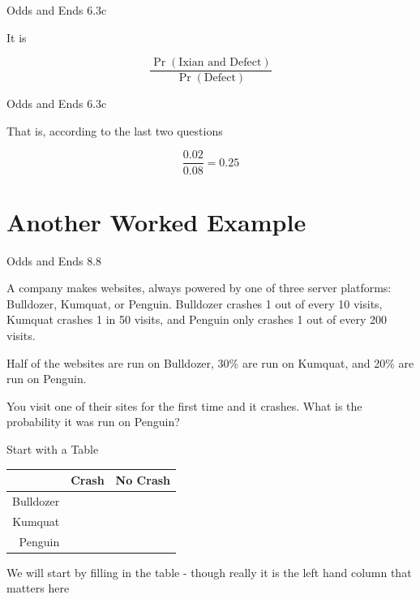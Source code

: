 \documentclass[
  ignorenonframetext,
]{beamer}
\renewcommand{\,}{\text{, }}
\begin{document}
\begin{frame}{Odds and Ends 6.3c}
\protect\hypertarget{odds-and-ends-6.3c-2}{}

It is

\[
\frac{\Pr(\text{Ixian and Defect})}{\Pr(\text{Defect})}
\]

\end{frame}

\begin{frame}{Odds and Ends 6.3c}
\protect\hypertarget{odds-and-ends-6.3c-3}{}

That is, according to the last two questions

\[
\frac{0.02}{0.08} = 0.25
\]

\end{frame}

\hypertarget{another-worked-example}{%
\section{Another Worked Example}\label{another-worked-example}}

\begin{frame}{Odds and Ends 8.8}
\protect\hypertarget{odds-and-ends-8.8}{}

A company makes websites, always powered by one of three server
platforms: Bulldozer, Kumquat, or Penguin. Bulldozer crashes 1 out of
every 10 visits, Kumquat crashes 1 in 50 visits, and Penguin only
crashes 1 out of every 200 visits.

Half of the websites are run on Bulldozer, 30\% are run on Kumquat, and
20\% are run on Penguin.

You visit one of their sites for the first time and it crashes. What is
the probability it was run on Penguin?

\end{frame}

\begin{frame}{Start with a Table}
\protect\hypertarget{start-with-a-table}{}

\begin{longtable}[]{@{}rcc@{}}
\toprule
& Crash & No Crash\tabularnewline
\midrule
\endhead
Bulldozer & &\tabularnewline
Kumquat & &\tabularnewline
Penguin & &\tabularnewline
\bottomrule
\end{longtable}

We will start by filling in the table - though really it is the left
hand column that matters here

\end{frame}
\end{document}
